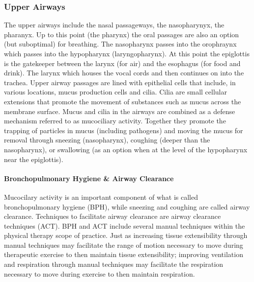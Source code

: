 \subsubsection{Upper Airways}

The upper airways include the nasal passageways, the nasopharynyx, the pharanyx. Up to this point (the pharynx) the oral passages are also an option (but suboptimal) for breathing. The nasopharynx passes into the orophraynx which passes into the hypopharynx (laryngopharynx). At this point the epiglottis is the gatekeeper between the larynx (for air) and the esophagus (for food and drink).  The larynx which houses the vocal cords and then continues on into the trachea. Upper airway passages are lined with epithelial cells that include, in various locations, mucus production cells and cilia. Cilia are small cellular extensions that promote the movement of substances such as mucus across the membrane surface. Mucus and cilia in the airways are combined as a defense mechanism referred to as mucociliary activity. Together they promote the trapping of particles in mucus (including pathogens) and moving the mucus for removal through sneezing (nasopharynx), coughing (deeper than the nasopharynx), or swallowing (as an option when at the level of the hypopharynx near the epiglottis). 

\paragraph{Bronchopulmonary Hygiene \& Airway Clearance}
Mucocilary activity is an important component of what is called bronchopulmonary hygiene (BPH), while sneezing and coughing are called airway clearance. Techniques to facilitate airway clearance are airway clearance techniques (ACT). BPH and ACT include several manual techniques within the physical therapy scope of practice. Just as increasing tissue extensibility through manual techniques may facilitate the range of motion necessary to move during therapeutic exercise to then maintain tissue extensibility; improving ventilation and respiration through manual techniques may facilitate the respiration necessary to move during exercise to then maintain respiration.  

